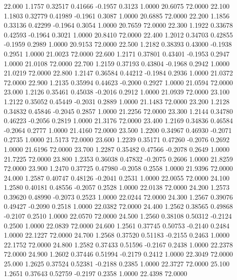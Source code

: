   22.000   1.1757   0.32517   0.41666  -0.1957   0.3123   1.0000  20.6075  72.0000
  22.100   1.1803   0.32779   0.41989  -0.1961   0.3087   1.0000  20.6885  72.0000
  22.200   1.1856   0.33136   0.42299  -0.1964   0.3054   1.0000  20.7659  72.0000
  22.300   1.1922   0.33678   0.42593  -0.1964   0.3021   1.0000  20.8410  72.0000
  22.400   1.2012   0.34703   0.42855  -0.1959   0.2989   1.0000  20.9153  72.0000
  22.500   1.2182   0.38393   0.43000  -0.1938   0.2951   1.0000  21.0023  72.0000
  22.600   1.2171   0.37801   0.43401  -0.1953   0.2947   1.0000  21.0108  72.0000
  22.700   1.2159   0.37193   0.43804  -0.1968   0.2942   1.0000  21.0219  72.0000
  22.800   1.2147   0.36584   0.44212  -0.1984   0.2936   1.0000  21.0372  72.0000
  22.900   1.2135   0.35994   0.44623  -0.2000   0.2927   1.0000  21.0594  72.0000
  23.000   1.2126   0.35461   0.45038  -0.2016   0.2912   1.0000  21.0939  72.0000
  23.100   1.2122   0.35052   0.45449  -0.2031   0.2889   1.0000  21.1483  72.0000
  23.200   1.2128   0.34832   0.45846  -0.2045   0.2857   1.0000  21.2256  72.0000
  23.300   1.2144   0.34780   0.46223  -0.2056   0.2819   1.0000  21.3176  72.0000
  23.400   1.2169   0.34836   0.46584  -0.2064   0.2777   1.0000  21.4160  72.0000
  23.500   1.2200   0.34967   0.46930  -0.2071   0.2735   1.0000  21.5173  72.0000
  23.600   1.2239   0.35171   0.47260  -0.2076   0.2692   1.0000  21.6196  72.0000
  23.700   1.2287   0.35482   0.47566  -0.2078   0.2649   1.0000  21.7225  72.0000
  23.800   1.2353   0.36038   0.47832  -0.2075   0.2606   1.0000  21.8259  72.0000
  23.900   1.2470   0.37725   0.47980  -0.2058   0.2558   1.0000  21.9396  72.0000
  24.000   1.2587   0.40747   0.48126  -0.2041   0.2531   1.0000  22.0055  72.0000
  24.100   1.2580   0.40181   0.48556  -0.2057   0.2528   1.0000  22.0138  72.0000
  24.200   1.2573   0.39620   0.48990  -0.2073   0.2523   1.0000  22.0244  72.0000
  24.300   1.2567   0.39076   0.49427  -0.2090   0.2518   1.0000  22.0382  72.0000
  24.400   1.2562   0.38565   0.49868  -0.2107   0.2510   1.0000  22.0570  72.0000
  24.500   1.2560   0.38108   0.50312  -0.2124   0.2500   1.0000  22.0839  72.0000
  24.600   1.2561   0.37745   0.50753  -0.2140   0.2484   1.0000  22.1227  72.0000
  24.700   1.2568   0.37520   0.51183  -0.2155   0.2463   1.0000  22.1752  72.0000
  24.800   1.2582   0.37433   0.51596  -0.2167   0.2438   1.0000  22.2378  72.0000
  24.900   1.2602   0.37446   0.51994  -0.2179   0.2412   1.0000  22.3049  72.0000
  25.000   1.2625   0.37524   0.52381  -0.2188   0.2385   1.0000  22.3727  72.0000
  25.100   1.2651   0.37643   0.52759  -0.2197   0.2358   1.0000  22.4398  72.0000
